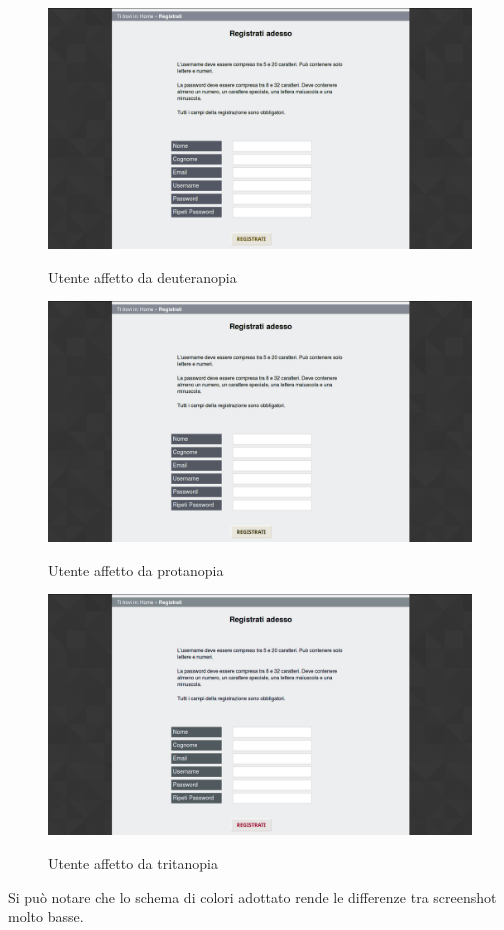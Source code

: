 	\begin{figure}
		\includegraphics[scale=0.3]{images/deuteranopia2.jpg}\\[1cm] \caption{Utente affetto da deuteranopia}
	\end{figure}
	\begin{figure}
		\includegraphics[scale=0.3]{images/protanopia2.jpg}\\[1cm] \caption{Utente affetto da protanopia} 
	\end{figure}
	\begin{figure}
		\includegraphics[scale=0.3]{images/tritanopia2.jpg}\\[1cm] \caption{Utente affetto da tritanopia} 
	\end{figure}
	\newpage
	Si può notare che lo schema di colori adottato rende le differenze tra screenshot molto basse.\\
